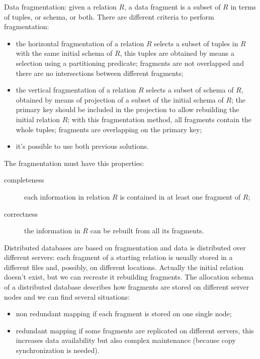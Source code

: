 Data fragmentation: given a relation $R$, a data fragment is a subset of $R$ in terms of tuples, or schema, or both.
There are different criteria to perform fragmentation:
\begin{itemize}
	\item the horizontal fragmentation of a relation $R$ selects a subset of tuples in $R$ with the same initial schema of $R$, this tuples are obtained by means a selection using a partitioning predicate; fragments are not overlapped and there are no intersections between different fragments;
	\item the vertical fragmentation of a relation $R$ selects a subset of schema of $R$, obtained by means of projection of a subset of the initial schema of $R$; the primary key should be included in the projection to allow rebuilding the initial relation $R$; with this fragmentation method, all fragments contain the whole tuples; fragments are overlapping on the primary key;
	\item it's possible to use both previous solutions.
\end{itemize}
The fragmentation must have this properties:
\begin{description}
	\item[completeness] each information in relation $R$ is contained in at least one fragment of $R$;
	\item[correctness] the information in $R$ can be rebuilt from all its fragments.
\end{description}

Distributed databases are based on fragmentation and data is distributed over different servers: each fragment of a starting relation is usually stored in a different files and, possibly, on different locations.
Actually the initial relation doesn't exist, but we can recreate it rebuilding fragments.
The allocation schema of a distributed database describes how fragments are stored on different server nodes and we can find several situations:
\begin{itemize}
	\item non redundant mapping if each fragment is stored on one single node;
	\item redundant mapping if some fragments are replicated on different servers, this increases data availability but also complex maintenance (because copy synchronization is needed).
\end{itemize}

